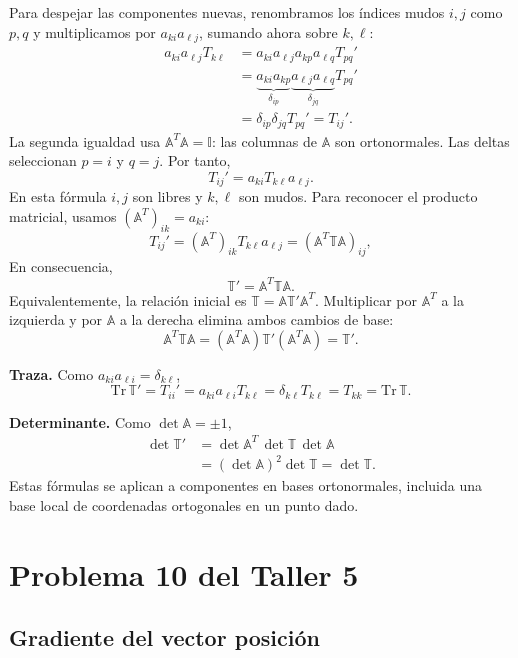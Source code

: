 Para despejar las componentes nuevas, renombramos los índices mudos $i,j$ como $p,q$ y multiplicamos por $a_{ki}a_{\ell j}$, sumando ahora sobre $k,\ell$:
\[
\begin{aligned}
a_{ki}a_{\ell j}T_{k\ell}
&=a_{ki}a_{\ell j}a_{kp}a_{\ell q}T_{pq}'\\
&=\underbrace{a_{ki}a_{kp}}_{\delta_{ip}}
\underbrace{a_{\ell j}a_{\ell q}}_{\delta_{jq}}T_{pq}'\\
&=\delta_{ip}\delta_{jq}T_{pq}'=T_{ij}'.
\end{aligned}
\]
La segunda igualdad usa $\mathbb A^T\mathbb A=\mathbb I$: las columnas de $\mathbb A$ son ortonormales. Las deltas seleccionan $p=i$ y $q=j$. Por tanto,
\[
\boxed{T_{ij}'=a_{ki}T_{k\ell}a_{\ell j}}.
\]
En esta fórmula $i,j$ son libres y $k,\ell$ son mudos. Para reconocer el producto matricial, usamos $(\mathbb A^T)_{ik}=a_{ki}$:
\[
T_{ij}'=(\mathbb A^T)_{ik}T_{k\ell}a_{\ell j}
=(\mathbb A^T\mathbb T\mathbb A)_{ij},
\]
En consecuencia,
\[
\boxed{\mathbb T'=\mathbb A^T\mathbb T\mathbb A}.
\]
Equivalentemente, la relación inicial es $\mathbb T=\mathbb A\mathbb T'\mathbb A^T$. Multiplicar por $\mathbb A^T$ a la izquierda y por $\mathbb A$ a la derecha elimina ambos cambios de base:
\[
\mathbb A^T\mathbb T\mathbb A
=(\mathbb A^T\mathbb A)\mathbb T'(\mathbb A^T\mathbb A)
=\mathbb T'.
\]

\textbf{Traza.} Como $a_{ki}a_{\ell i}=\delta_{k\ell}$,
\[
\mathrm{Tr}\,\mathbb T'=T_{ii}'
=a_{ki}a_{\ell i}T_{k\ell}
=\delta_{k\ell}T_{k\ell}
=T_{kk}=\boxed{\mathrm{Tr}\,\mathbb T}.
\]

\textbf{Determinante.} Como $\det\mathbb A=\pm1$,
\[
\begin{aligned}
\det\mathbb T'
&=\det\mathbb A^T\,\det\mathbb T\,\det\mathbb A\\
&=(\det\mathbb A)^2\det\mathbb T
=\boxed{\det\mathbb T}.
\end{aligned}
\]
Estas fórmulas se aplican a componentes en bases ortonormales, incluida una base local de coordenadas ortogonales en un punto dado.

\section{Problema 10 del Taller 5}

\subsection{Gradiente del vector posición}

